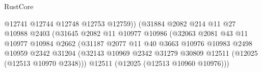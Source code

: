 \begin{lexlean}{RustCore}
\begin{coremodule}
                                                  @12741
                                                  @12744
                                                  @12748
                                                  @12753
                                                  @12759))
                                              (@31884
                                                @2082
                                                @214
                                                @11
                                                @27
                                                @10988
                                                @2403
                                                (@31645
                                                  @2082
                                                  @11
                                                  @10977
                                                  @10986
                                                  (@32063
                                                    @2081
                                                    @43
                                                    @11
                                                    @10977
                                                    @10984
                                                    @2662
                                                    (@31187
                                                      @2077
                                                      @11
                                                      @40
                                                      @3663
                                                      @10976
                                                      @10983
                                                      @2498
                                                      @10959
                                                      @2342
                                                      @31204
                                                      (@32143
                                                        @10969
                                                        @2342
                                                        @31279
                                                        @30809
                                                        @12511
                                                        (@12025 (@12513 @10970 @2348)))
                                                      @12511
                                                      (@12025 (@12513 @10960 @10976)))

\end{coremodule}
\end{lexlean}
